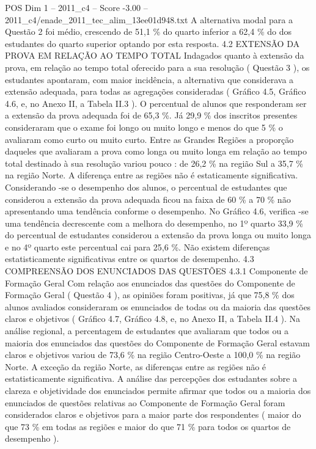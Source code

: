 \begin{textsample}{POS Dim 1 – 2011\_c4 – Score -3.00 – 2011\_c4/enade\_2011\_tec\_alim\_13ee01d948.txt}
A alternativa modal para a Questão 2 foi médio, crescendo de 51,1 \% do quarto inferior a 62,4 \% do dos estudantes do quarto superior optando por esta resposta. 4.2 EXTENSÃO DA PROVA EM RELAÇÃO AO TEMPO TOTAL Indagados quanto à extensão da prova, em relação ao tempo total oferecido para a sua resolução ( Questão 3 ), os estudantes apontaram, com maior incidência, a alternativa que considerava a extensão adequada, para todas as agregações consideradas ( Gráfico 4.5, Gráfico 4.6, e, no Anexo II, a Tabela II.3 ).
O percentual de alunos que responderam ser a extensão da prova adequada foi de 65,3 \%.
Já 29,9 \% dos inscritos presentes consideraram que o exame foi longo ou muito longo e menos do que 5 \% o avaliaram como curto ou muito curto.
Entre as Grandes Regiões a proporção daqueles que avaliaram a prova como longa ou muito longa em relação ao tempo total destinado à sua resolução variou pouco : de 26,2 \% na região Sul a 35,7 \% na região Norte.
A diferença entre as regiões não é estaticamente significativa.
Considerando -se o desempenho dos alunos, o percentual de estudantes que considerou a extensão da prova adequada ficou na faixa de 60 \% a 70 \% não apresentando uma tendência conforme o desempenho.
No Gráfico 4.6, verifica -se uma tendência decrescente com a melhora do desempenho, no 1º quarto 33,9 \% do percentual de estudantes considerou a extensão da prova longa ou muito longa e no 4º quarto este percentual cai para 25,6 \%.
Não existem diferenças estatisticamente significativas entre os quartos de desempenho. 4.3 COMPREENSÃO DOS ENUNCIADOS DAS QUESTÕES 4.3.1 Componente de Formação Geral Com relação aos enunciados das questões do Componente de Formação Geral ( Questão 4 ), as opiniões foram positivas, já que 75,8 \% dos alunos avaliados consideraram os enunciados de todas ou da maioria das questões claros e objetivos ( Gráfico 4.7, Gráfico 4.8, e, no Anexo II, a Tabela II.4 ).
Na análise regional, a percentagem de estudantes que avaliaram que todos ou a maioria dos enunciados das questões do Componente de Formação Geral estavam claros e objetivos variou de 73,6 \% na região Centro-Oeste a 100,0 \% na região Norte.
A exceção da região Norte, as diferenças entre as regiões não é estatisticamente significativa.
A análise das percepções dos estudantes sobre a clareza e objetividade dos enunciados permite afirmar que todos ou a maioria dos enunciados de questões relativas ao Componente de Formação Geral foram considerados claros e objetivos para a maior parte dos respondentes ( maior do que 73 \% em todas as regiões e maior do que 71 \% para todos os quartos de desempenho ).

\end{textsample}
